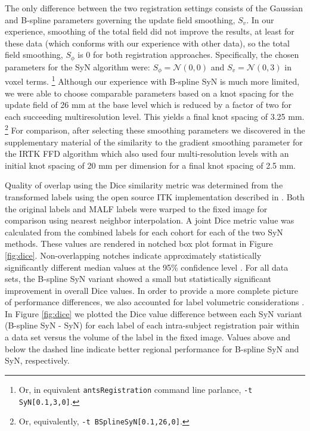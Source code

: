 \documentclass{frontiersSCNS}
\begin{document}
The only difference between the two registration 
settings consists of the Gaussian and 
B-spline parameters governing the update field smoothing, $S_v$.  
In our 
experience, smoothing of the total field did not improve the results, at
least for these data (which conforms with our experience with other
data), so the total field smoothing, $S_{\phi}$ is 0 for
both registration approaches.  Specifically, the chosen parameters
for the SyN algorithm were:  $S_{\phi} = \mathcal{N}(0,0)$ and 
$S_{v} = \mathcal{N}(0,3)$ in voxel terms.%
\footnote{
 Or, in equivalent {\tt antsRegistration} command line parlance, {\tt -t
 SyN[0.1,3,0]}.
 }  Although our experience with B-spline SyN is much more limited, we 
were able to choose comparable parameters based on a knot spacing
for the update field of 26 mm at the base level which is reduced by
a factor of two for each succeeding multiresolution level.  This 
yields a final knot spacing of 3.25 mm.%
\footnote{
 Or, equivalently, {\tt -t
 BSplineSyN[0.1,26,0]}.
 }
For comparison, after selecting these smoothing parameters we discovered 
in the supplementary material of \cite{klein2009} the similarity to the 
gradient smoothing parameter for the IRTK FFD algorithm
which also used four multi-resolution levels with an initial knot spacing of
20 mm per dimension for a final knot spacing of 2.5 mm.  

Quality of overlap  using the 
Dice similarity metric 
was determined from the transformed labels
using the open source ITK
implementation described in \cite{tustison2009a}.
Both the original labels and MALF labels were warped
to the fixed image for comparison using nearest neighbor
interpolation.  A joint Dice metric value was calculated
from the combined labels for each cohort for each of the
two SyN methods.  These values are rendered in notched
box plot format in Figure \ref{fig:dice}.  Non-overlapping notches
indicate approximately statistically significantly different median values
at the 95\% confidence level \citep{mcgill1978}.
For all data sets, the B-spline SyN variant showed a small but statistically
significant improvement in overall Dice values.
In order to provide a more complete picture of performance differences,
we also accounted for label volumetric considerations \citep{rohlfing2012}.  In Figure
\ref{fig:dice} we plotted the Dice value difference between each
SyN variant (B-spline SyN - SyN) for each label of each intra-subject
registration pair within a data set versus the volume of the label
in the fixed image.  Values above and below the dashed line indicate better 
regional performance for B-spline SyN and SyN, respectively.
\end{document}
